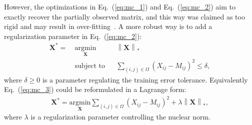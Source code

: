 However, the optimizations in Eq.~(\ref{eq:mc_1}) and Eq.~(\ref{eq:mc_2}) aim to exactly recover the partially observed matrix, and this way was claimed as too rigid and may result in over-fitting~\cite{mazumder2010spectral}. A more robust way is to add a regularization parameter in Eq.~(\ref{eq:mc_2}):
\begin{equation}
    \label{eq:mc_3}
    \begin{aligned}
        \mathbf{X}^* = ~&\underset{\mathbf{X}}{\text{argmin}} 
               &&\left \| \mathbf{X} \right \|_*\\
               &\text{subject to}
               && \sum_{(i, j)\in \Omega}(X_{ij} - M_{ij})^2\leq \delta,
    \end{aligned}
\end{equation}
where $\delta \geq 0$ is a parameter regulating the training error tolerance. Equivalently Eq.~(\ref{eq:mc_3}) could be reformulated in a Lagrange form:
\begin{equation}
    \label{eq:mc_4}
    \begin{aligned}
        \mathbf{X}^* = \underset{\mathbf{X}}{\text{argmin}} \sum_{(i, j)\in \Omega} (X_{ij} - M_{ij})^2 + \lambda \left \|\mathbf{X} \right \|_{*},
    \end{aligned}
\end{equation}
where $\lambda$ is a regularization parameter controlling the nuclear norm.
